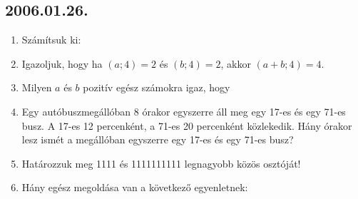\subsection*{2006.01.26.}
\begin{enumerate}
\item Számítsuk ki: 


\item Igazoljuk, hogy ha $(a;4)=2$ és $(b;4)=2$, akkor $(a+b;4)=4$.

\item Milyen $a$ és $b$ pozitív egész számokra igaz, hogy


\item Egy autóbuszmegállóban 8 órakor egyszerre áll meg egy 17-es és egy 71-es busz. A 17-es 12 percenként, a 71-es 20 percenként közlekedik. Hány órakor lesz ismét a megállóban egyszerre egy 17-es és egy 71-es busz?

\item Határozzuk meg 1111 és 1111111111 legnagyobb közös osztóját!

\item Hány egész megoldása van a következő egyenletnek:

\end{enumerate}

